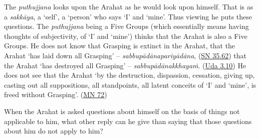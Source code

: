 The \emph{puthujjana} looks upon the Arahat as he would look upon himself. That is as a \emph{sakkāya}, a `self', a `person' who says `I' and `mine'. Thus viewing he puts these questions. The \emph{puthujjana} being a Five  Groups (which essentially means having thoughts of subjectivity, of `I' and `mine') thinks that the Arahat is also a Five  Groups. He does not know that  Grasping is extinct in the Arahat, that the Arahat `has laid down all Grasping' -- \emph{sabbupādānapariyādāna}, (\href{https://suttacentral.net/sn35.62/en/bodhi}{SN 35.62}) that the Arahat `has destroyed all Grasping' -- \emph{sabbupādānakkhayaṁ}. (\href{https://suttacentral.net/ud3.10/en/anandajoti}{Uda 3.10}) He does not see that the Arahat `by the destruction, dispassion, cessation, giving up, casting out all suppositions, all standpoints, all latent conceits of `I' and `mine', is freed without Grasping'. (\href{https://suttacentral.net/mn72/en/thanissaro}{MN 72})

When the Arahat is asked questions about himself on the basis of things not applicable to him, what other reply can he give than saying that those questions about him do not apply to him?

